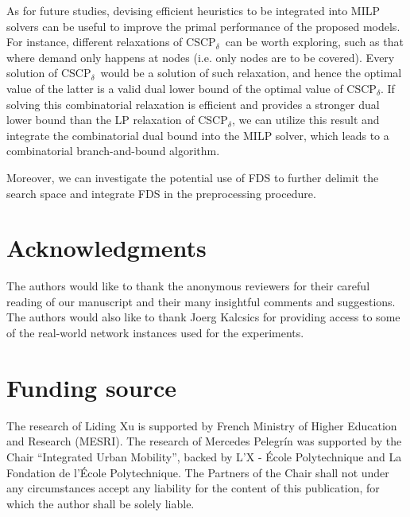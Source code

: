 \documentclass[review]{elsarticle}
\newcommand{\dlt}{{\delta}}
\newcommand{\problem}{CSCP$_\dlt$}
\theoremstyle{definition}
\begin{document}
As for future studies, devising efficient heuristics to be integrated into MILP solvers can be useful to improve the primal performance of the proposed models. For instance, different relaxations of  \problem\ can be worth exploring, such as that where demand only happens at nodes (i.e. only nodes are to be covered). Every solution of \problem\, would be a solution of such relaxation, and hence the optimal value of the latter is a valid dual lower bound of the optimal value of  \problem.  If solving this combinatorial relaxation is efficient and provides a stronger dual lower bound than the LP relaxation of \problem, we can utilize this result and integrate the combinatorial dual bound into the MILP solver, which leads to a combinatorial branch-and-bound algorithm.



Moreover, we can investigate the potential use of FDS to further delimit the search space and integrate FDS in the preprocessing procedure.

\begin{comment}
Finally, there is a structure in \problem\;as that of Benders decomposition: the main decision variables (in the objective function) are the binary variables $y_f$ indicating whether  the facilities in edges or at nodes are installed; the sub decision variables are the continuous variables $q_{e'}$ defining the exact locations of facilities. We can investigate Benders methods to check whether other auxiliary variables can be eliminated.
\end{comment}


\section*{Acknowledgments}
The authors would like to thank the anonymous reviewers for their careful reading of our manuscript and their many insightful comments and suggestions. The authors would also like to thank Joerg Kalcsics for providing access to some of the real-world network instances used for the experiments.


\section*{Funding source}
The research of Liding Xu is supported by French Ministry of Higher Education and Research (MESRI). The research of Mercedes Pelegr\'in was supported by the Chair “Integrated Urban Mobility”, backed by L’X -
École Polytechnique and La Fondation de l’École Polytechnique. The Partners of the Chair shall
not under any circumstances accept any liability for the content of this publication, for which the author shall be solely liable.
\end{document}
